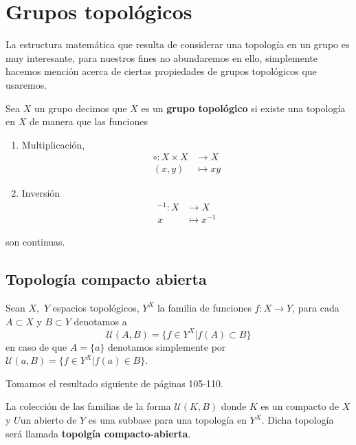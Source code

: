 
\section*{Grupos topológicos}
La estructura matemática que resulta  de considerar una topología en un grupo es muy interesante, para nuestros fines no abundaremos en ello, simplemente hacemos mención acerca de ciertas propiedades de grupos topológicos que usaremos.  

\begin{df}
	Sea $X$ un grupo decimos que $X$ es un \textbf{grupo topológico} si existe una topología en $X$ de manera que las funciones 
	\begin{enumerate}
	\item  Multiplicación,
	\begin{align*}
	\circ : X \times X & \to X \\
	(x,y) & \mapsto xy
	\end{align*}
	
	\item Inversión
	\begin{align*}
	^{-1} : X & \to X \\
	x & \mapsto x^{-1}
	\end{align*}		
	 
	\end{enumerate}
son continuas.	
	\end{df}
	
\subsection*{Topología compacto abierta}	
Sean $X,$ $Y$ espacios topológicos, $Y^X$ la familia de funciones $f:X \to Y$, para cada $A \subset X$ y $B \subset Y$ denotamos a $$\mathcal{U}(A,B)=\{f \in Y^X|f(A)\subset B \}$$ en caso de que $A=\{a\}$ denotamos  simplemente por $\mathcal{U}(a,B)=\{f \in Y^X|f(a) \in B\}$.


Tomamos el resultado siguiente de \cite{top_juan} páginas 105-110.

\begin{pr}
	La colección de las familias de la forma $\mathcal{U}(K,B)$ donde $K$ es un compacto de $X$ y $U$un abierto de $Y$ es una subbase para una topología en $Y^X$. Dicha topología será llamada \textbf{topolgía compacto-abierta}.
\end{pr}

